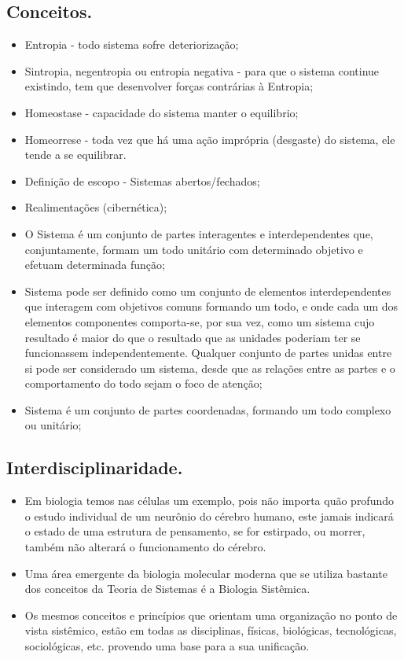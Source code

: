 \documentclass[a4paper,12pt]{article}
\begin{document}
\subsection{Conceitos.}
\begin{itemize}
\item Entropia - todo sistema sofre deteriorização;
\item Sintropia, negentropia ou entropia negativa - para que o sistema continue existindo, tem que desenvolver forças contrárias à Entropia;
\item Homeostase - capacidade do sistema manter o equilibrio;
\item Homeorrese - toda vez que há uma ação imprópria (desgaste) do sistema, ele tende a se equilibrar.
\item Definição de escopo - Sistemas abertos/fechados;
\item Realimentações (cibernética);
\item O Sistema é um conjunto de partes interagentes e interdependentes que, conjuntamente, formam um todo unitário com determinado objetivo e efetuam determinada função;
\item Sistema pode ser definido como um conjunto de elementos interdependentes que interagem com objetivos comuns formando um todo, e onde cada um dos elementos componentes comporta-se, por sua vez, como um sistema cujo resultado é maior do que o resultado que as unidades poderiam ter se funcionassem independentemente. Qualquer conjunto de partes unidas entre si pode ser considerado um sistema, desde que as relações entre as partes e o comportamento do todo sejam o foco de atenção;
\item Sistema é um conjunto de partes coordenadas, formando um todo complexo ou unitário;
\end{itemize}


\subsection{Interdisciplinaridade.}
\begin{itemize}
\item Em biologia temos nas células um exemplo, pois não importa quão profundo o estudo individual de um neurônio do cérebro humano, este jamais indicará o estado de uma estrutura de pensamento, se for estirpado, ou morrer, também não alterará o funcionamento do cérebro.
\item Uma área emergente da biologia molecular moderna que se utiliza bastante dos conceitos da Teoria de Sistemas é a Biologia Sistêmica.
\item Os mesmos conceitos e princípios que orientam uma organização no ponto de vista sistêmico, estão em todas as disciplinas, físicas, biológicas, tecnológicas, sociológicas, etc. provendo uma base para a sua unificação.
\end{itemize}
\end{document}
